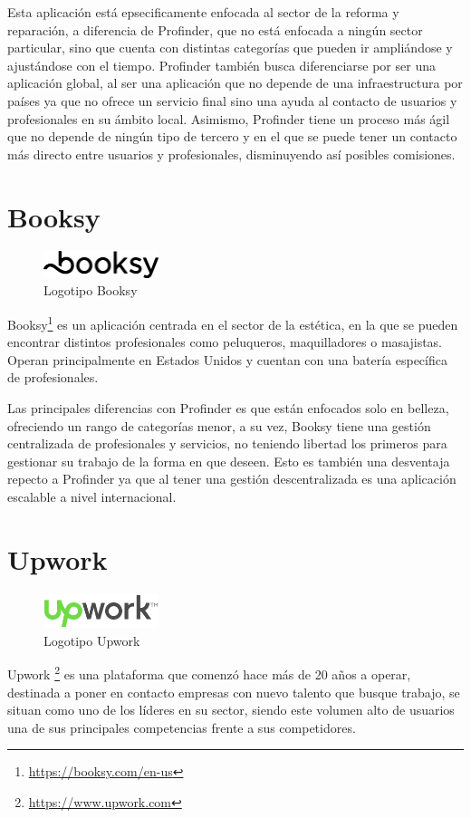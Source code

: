 Esta aplicación está epsecificamente enfocada al sector de la reforma y reparación, a diferencia de Profinder, que no está enfocada a ningún sector particular, sino que cuenta con distintas categorías que pueden ir ampliándose y ajustándose con el tiempo. Profinder también busca diferenciarse por ser una aplicación global, al ser una aplicación que no depende de una infraestructura por países ya que no ofrece un servicio final sino una ayuda al contacto de usuarios y profesionales en su ámbito local. Asimismo, Profinder tiene un proceso más ágil que no depende de ningún tipo de tercero y en el que se puede tener un contacto más directo entre usuarios y profesionales, disminuyendo así posibles comisiones.
\section{Booksy}
\begin{figure}[h]
	\centering
	\includegraphics[width = 0.3\textwidth]{Imagenes/Fuentes/logo_booksy.png}
	\caption{Logotipo Booksy}
	\label{fig:booksy_logo}
\end{figure}
Booksy\footnote{\url{https://booksy.com/en-us}} es un aplicación centrada en el sector de la estética, en la que se pueden encontrar distintos profesionales como peluqueros, maquilladores o masajistas. Operan principalmente en Estados Unidos y cuentan con una batería específica de profesionales.

Las principales diferencias con Profinder es que están enfocados solo en belleza, ofreciendo un rango de categorías menor, a su vez, Booksy tiene una gestión centralizada de profesionales y servicios, no teniendo libertad los primeros para gestionar su trabajo de la forma en que deseen. Esto es también una desventaja repecto a Profinder ya que al tener una gestión descentralizada es una aplicación escalable a nivel internacional. 
\newpage
\section{Upwork}
\begin{figure}[h]
	\centering
	\includegraphics[width = 0.3\textwidth]{Imagenes/Fuentes/logo_upwork.png}
	\caption{Logotipo Upwork}
	\label{fig:upwork_logo}
\end{figure}
Upwork \footnote{\url{https://www.upwork.com}} es una plataforma que comenzó hace más de 20 años a operar, destinada a poner en contacto empresas con nuevo talento que busque trabajo, se situan como uno de los líderes en su sector, siendo este volumen alto de usuarios una de sus principales competencias frente a sus competidores.

